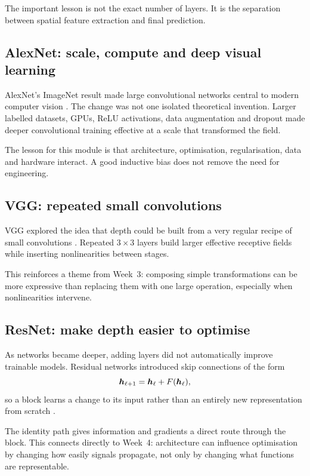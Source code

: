 The important lesson is not the exact number of layers. It is the separation between spatial feature extraction and final prediction.

\subsection{AlexNet: scale, compute and deep visual learning}

AlexNet's ImageNet result made large convolutional networks central to modern computer vision \parencite{krizhevsky2012}. The change was not one isolated theoretical invention. Larger labelled datasets, GPUs, ReLU activations, data augmentation and dropout made deeper convolutional training effective at a scale that transformed the field.

The lesson for this module is that architecture, optimisation, regularisation, data and hardware interact. A good inductive bias does not remove the need for engineering.

\subsection{VGG: repeated small convolutions}

VGG explored the idea that depth could be built from a very regular recipe of small convolutions \parencite{simonyan2015}. Repeated \(3\times3\) layers build larger effective receptive fields while inserting nonlinearities between stages.

This reinforces a theme from Week~3: composing simple transformations can be more expressive than replacing them with one large operation, especially when nonlinearities intervene.

\subsection{ResNet: make depth easier to optimise}

As networks became deeper, adding layers did not automatically improve trainable models. Residual networks introduced skip connections of the form
\begin{equation}
  \bm{h}_{\ell+1} = \bm{h}_{\ell} + F(\bm{h}_{\ell}),
  \label{eq:week5-residual}
\end{equation}
so a block learns a change to its input rather than an entirely new representation from scratch \parencite{he2016}.

The identity path gives information and gradients a direct route through the block. This connects directly to Week~4: architecture can influence optimisation by changing how easily signals propagate, not only by changing what functions are representable.

